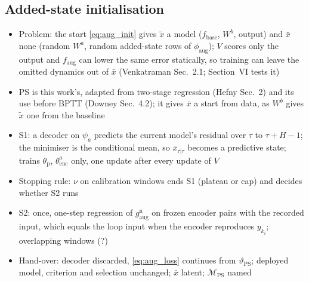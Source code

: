 \subsection{Added-state initialisation}\label{sec:aug_ps2}
\ifdraft
\begin{itemize}
\item Problem: the start \eqref{eq:aug_init} gives $\tilde x$ a model ($f_{\mathrm{base}}$, $W^b$, output) and $\bar x$ none (random $W^a$, random added-state rows of $\phi_{\mathrm{aug}}$); $V$ scores only the output and $f_{\mathrm{aug}}$ can lower the same error statically, so training can leave the omitted dynamics out of $\bar x$ (Venkatraman Sec.~2.1; Section~VI tests it)
\item PS is this work's, adapted from two-stage regression (Hefny Sec.~2) and its use before BPTT (Downey Sec.~4.2); it gives $\bar x$ a start from data, as $W^b$ gives $\tilde x$ one from the baseline
\item S1: a decoder on $\psi_a$ predicts the current model's residual over $\tau$ to $\tau+H-1$; the minimiser is the conditional mean, so $\bar x_{\tau|\tau}$ becomes a predictive state; trains $\theta_{\mathrm p}$, $\theta^a_{\mathrm{enc}}$ only, one update after every update of $V$
\item Stopping rule: $\nu$ on calibration windows ends S1 (plateau or cap) and decides whether S2 runs
\item S2: once, one-step regression of $g^{\mathrm n}_{\mathrm{aug}}$ on frozen encoder pairs with the recorded input, which equals the loop input when the encoder reproduces $y_{k_i}$; overlapping windows (?)
\item Hand-over: decoder discarded, \eqref{eq:aug_loss} continues from $\vartheta_{\mathrm{PS}}$; deployed model, criterion and selection unchanged; $\bar x$ latent; $\mathcal M_{\mathrm{PS}}$ named
\end{itemize}
\fi

